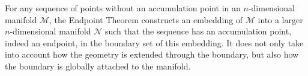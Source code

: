 \documentclass[pdflatex,sn-mathphys-num]{sn-jnl}
\theoremstyle{definition}
\begin{document}
For any sequence of points without an accumulation point in an $n$-dimensional manifold $\mathcal{M}$, the Endpoint Theorem constructs an embedding of $\mathcal{M}$ into a larger $n$-dimensional manifold $\mathcal{N}$ such that the sequence has an accumulation point, indeed an endpoint, in the boundary set of this embedding. It does not only take into account how the geometry is extended through the boundary, but also how the boundary is globally attached to the manifold.

\end{document}
